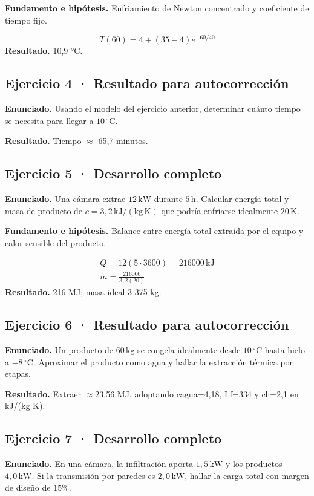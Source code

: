 \documentclass[11pt,a4paper]{article}
\begin{document}
\textbf{Fundamento e hipótesis.} Enfriamiento de Newton concentrado y coeficiente de tiempo fijo.

\[
T(60)=4+(35-4)e^{-60/40}
\]
\textbf{Resultado.} 10,9 °C.


\subsection*{Ejercicio 4 · Resultado para autocorrección}
\textbf{Enunciado.} Usando el modelo del ejercicio anterior, determinar cuánto tiempo se necesita para llegar a \(10\,^\circ\mathrm C\).

\textbf{Resultado.} Tiempo \ensuremath{\approx} 65,7 minutos.


\subsection*{Ejercicio 5 · Desarrollo completo}
\textbf{Enunciado.} Una cámara extrae \(12\,\mathrm{kW}\) durante \(5\,\mathrm h\). Calcular energía total y masa de producto de \(c=3{,}2\,\mathrm{kJ/(kg\,K)}\) que podría enfriarse idealmente \(20\,\mathrm K\).

\textbf{Fundamento e hipótesis.} Balance entre energía total extraída por el equipo y calor sensible del producto.

\[
\begin{gathered}
Q=12(5\cdot3600)=216000\,\mathrm{kJ}\\m=\frac{216000}{3{,}2(20)}
\end{gathered}
\]
\textbf{Resultado.} 216 MJ; masa ideal 3 375 kg.


\subsection*{Ejercicio 6 · Resultado para autocorrección}
\textbf{Enunciado.} Un producto de \(60\,\mathrm{kg}\) se congela idealmente desde \(10\,^\circ\mathrm C\) hasta hielo a \(-8\,^\circ\mathrm C\). Aproximar el producto como agua y hallar la extracción térmica por etapas.

\textbf{Resultado.} Extraer \ensuremath{\approx}23,56 MJ, adoptando cagua=4,18, Lf=334 y ch=2,1 en kJ/(kg K).


\subsection*{Ejercicio 7 · Desarrollo completo}
\textbf{Enunciado.} En una cámara, la infiltración aporta \(1{,}5\,\mathrm{kW}\) y los productos \(4{,}0\,\mathrm{kW}\). Si la transmisión por paredes es \(2{,}0\,\mathrm{kW}\), hallar la carga total con margen de diseño de \(15\%\).
\end{document}
